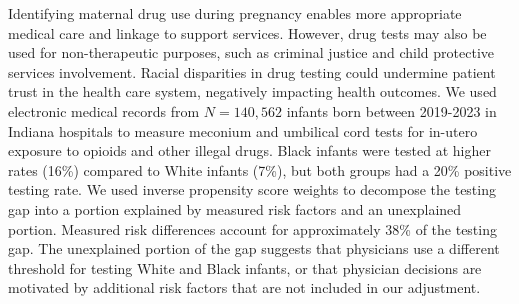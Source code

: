 Identifying maternal drug use during pregnancy enables more appropriate medical care and linkage to support services. However, drug tests may also be used for non-therapeutic purposes, such as criminal justice and child protective services involvement. Racial disparities in drug testing could undermine patient trust in the health care system, negatively impacting health outcomes. We used electronic medical records from $N = 140,562$ infants born between 2019-2023 in Indiana hospitals to measure meconium and umbilical cord tests for in-utero exposure to opioids and other illegal drugs. Black infants were tested at higher rates (16\%) compared to White infants (7\%), but both groups had a 20\% positive testing rate. We used inverse propensity score weights to decompose the testing gap into a portion explained by measured risk factors and an unexplained portion. Measured risk differences account for approximately 38\% of the testing gap. The unexplained portion of the gap suggests that physicians use a different threshold for testing White and Black infants, or that physician decisions are motivated by additional risk factors that are not included in our adjustment.

\bigskip
